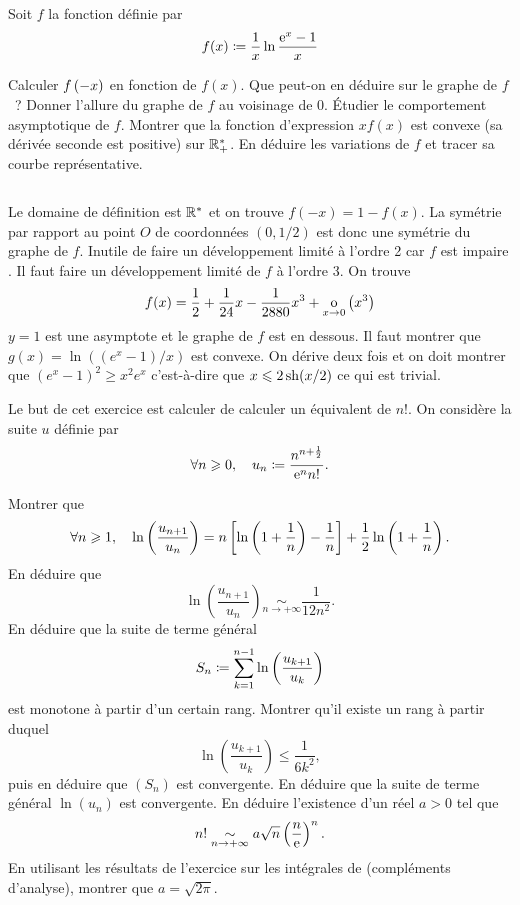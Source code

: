 \documentclass{magnolia}
\begin{document}
Soit $f$ la fonction définie par
\[f(x)\coloneqq\frac{1}{x}\ln\frac{{\rm e}^x-1}{x}\]
\begin{questions}
\question Calculer $f\left(-x\right)$ en fonction de $f(x)$. Que peut-on en déduire
  sur le graphe de $f$~?
\question Donner l'allure du graphe de $f$ au voisinage de 0.
\question Étudier le comportement asymptotique de $f$.
\question Montrer que la fonction d'expression $xf(x)$ est convexe (sa dérivée seconde est positive) sur $\mathbb{R}_+^*$.
  En déduire les variations de $f$ et tracer sa courbe représentative.
\end{questions}
\begin{sol}
$\quad$
\begin{questions}
\question Le domaine de définition est ${\mathbb{R}^*}$ et on trouve $f(-x)=1-f(x)$.
  La symétrie par rapport au point $O$ de coordonnées $(0,1/2)$ est donc une
  symétrie du graphe de $f$.
\question Inutile de faire un développement limité à l'ordre 2 car
  $f$ est \og impaire \fg. Il faut faire un développement limité de $f$
  à l'ordre 3. On trouve
  \[f(x)=\frac{1}{2}+\frac{1}{24}x-\frac{1}{2880}x^3+\underset{x \rightarrow 0}{\text{o}}\left(x^3\right)\]
\question $y=1$ est une asymptote et le graphe de $f$ est en dessous.
\question Il faut montrer que $g(x)=\ln((e^x-1)/x)$ est convexe. On dérive deux
  fois et on doit montrer que $(e^x-1)^2\geq x^2 e^x$ c'est-à-dire que
  $x\leqslant 2\operatorname{sh}(x/2)$ ce qui est trivial.
\end{questions}
\end{sol}

Le but de cet exercice est calculer de calculer un équivalent de $n!$.
On considère la suite $u$ définie par
$$\forall n \geqslant 0 ,\quad u_n\coloneqq\frac{n^{n+\frac{1}{2}}}{{\rm e}^n n!}.$$
\begin{questions}
\question Montrer que
  $$\forall n \geqslant 1 ,\quad \ln\left(\frac{u_{n+1}}{u_n}\right)=
    n\left[\ln\left(1+\frac{1}{n}\right)-\frac{1}{n}\right]+
    \frac{1}{2}\ln\left(1+\frac{1}{n}\right).$$
\question En déduire que
  $$\ln\left(\frac{u_{n+1}}{u_n}\right)
    \underset{n\rightarrow +\infty}{\sim}\frac{1}{12n^2}.$$
\question En déduire que la suite de terme général
  \[S_n\coloneqq\sum_{k=1}^{n-1} \ln\left(\frac{u_{k+1}}{u_k}\right)\]
  est monotone à partir d'un certain
  rang. Montrer qu'il existe un rang à partir duquel
  \[\ln\left(\frac{u_{k+1}}{u_k}\right)\leq\frac{1}{6k^2},\]
  puis en déduire que $(S_n)$ est convergente.
\question En déduire que la suite de terme général $\ln(u_n)$ est convergente.
\question En déduire l'existence d'un réel $a>0$ tel que 
  $$n!\underset{n\rightarrow+\infty}{\sim}a\sqrt{n}\left(\frac{n}{{\rm e}}\right)^n.$$
\question En utilisant les résultats de l'exercice sur les intégrales de 
  (compléments d'analyse), montrer que $a=\sqrt{2\pi}$.
\end{questions}
\end{document}
